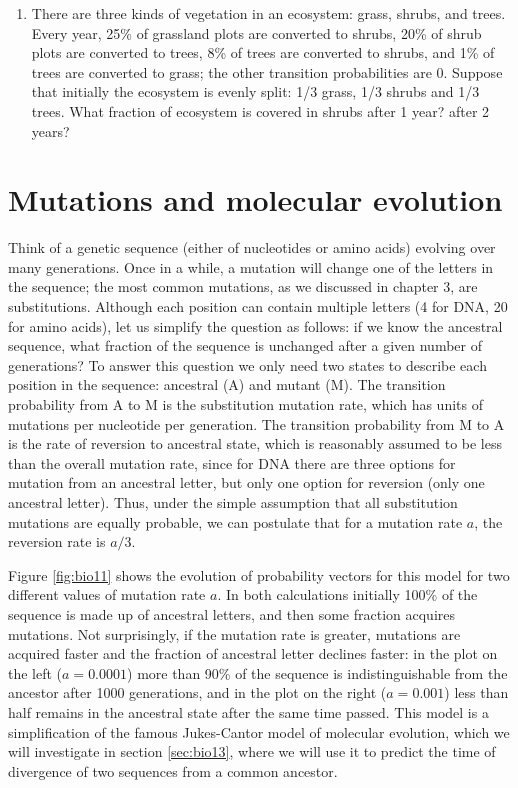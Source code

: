 \documentclass[
]{book}
\theoremstyle{definition}
\theoremstyle{definition}
\theoremstyle{definition}
\theoremstyle{remark}
\begin{document}
\begin{enumerate}
\item
  There are three kinds of vegetation in an ecosystem: grass, shrubs, and trees. Every year, 25\% of grassland plots are converted to shrubs, 20\% of shrub plots are converted to trees, 8\% of trees are converted to shrubs, and 1\% of trees are converted to grass; the other transition probabilities are 0. Suppose that initially the ecosystem is evenly split: 1/3 grass, 1/3 shrubs and 1/3 trees. What fraction of ecosystem is covered in shrubs after 1 year? after 2 years?
\end{enumerate}

\hypertarget{mutations-and-molecular-evolution}{%
\section{Mutations and molecular evolution}\label{mutations-and-molecular-evolution}}

Think of a genetic sequence (either of nucleotides or amino acids) evolving over many generations. Once in a while, a mutation will change one of the letters in the sequence; the most common mutations, as we discussed in chapter 3, are substitutions. Although each position can contain multiple letters (4 for DNA, 20 for amino acids), let us simplify the question as follows: if we know the ancestral sequence, what fraction of the sequence is unchanged after a given number of generations? To answer this question we only need two states to describe each position in the sequence: ancestral (A) and mutant (M). The transition probability from A to M is the substitution mutation rate, which has units of mutations per nucleotide per generation. The transition probability from M to A is the rate of reversion to ancestral state, which is reasonably assumed to be less than the overall mutation rate, since for DNA there are three options for mutation from an ancestral letter, but only one option for reversion (only one ancestral letter). Thus, under the simple assumption that all substitution mutations are equally probable, we can postulate that for a mutation rate \(a\), the reversion rate is \(a/3\).

Figure \ref{fig:bio11} shows the evolution of probability vectors for this model for two different values of mutation rate \(a\). In both calculations initially 100\% of the sequence is made up of ancestral letters, and then some fraction acquires mutations. Not surprisingly, if the mutation rate is greater, mutations are acquired faster and the fraction of ancestral letter declines faster: in the plot on the left (\(a=0.0001\)) more than 90\% of the sequence is indistinguishable from the ancestor after 1000 generations, and in the plot on the right (\(a=0.001\)) less than half remains in the ancestral state after the same time passed. This model is a simplification of the famous Jukes-Cantor model of molecular evolution, which we will investigate in section \ref{sec:bio13}, where we will use it to predict the time of divergence of two sequences from a common ancestor.
\end{document}
